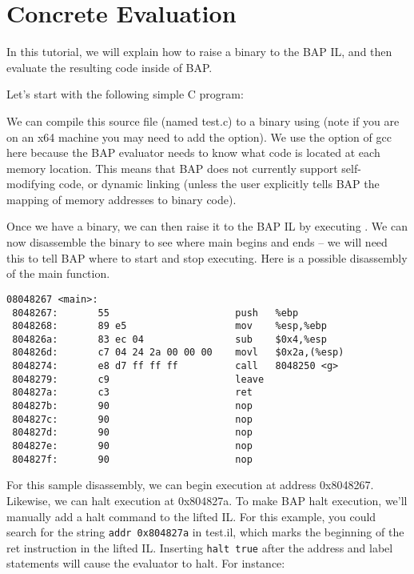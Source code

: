 \section{Concrete Evaluation}

In this tutorial, we will explain how to raise a binary to the BAP IL,
and then evaluate the resulting code inside of BAP.

Let's start with the following simple C program:


We can compile this source file (named test.c) to a binary using
 (note if you are on an x64 machine you may
need to add the  option).  We use the  option of
gcc here because the BAP evaluator needs to know what code is located
at each memory location. This means that BAP does not currently
support self-modifying code, or dynamic linking (unless the user
explicitly tells BAP the mapping of memory addresses to binary code).

Once we have a binary, we can then raise it to the BAP IL by executing
. We can now disassemble the binary
to see where main begins and ends -- we will need this to tell BAP
where to start and stop executing. Here is a possible disassembly of
the main function.

\begin{verbatim}
08048267 <main>:
 8048267:       55                      push   %ebp
 8048268:       89 e5                   mov    %esp,%ebp
 804826a:       83 ec 04                sub    $0x4,%esp
 804826d:       c7 04 24 2a 00 00 00    movl   $0x2a,(%esp)
 8048274:       e8 d7 ff ff ff          call   8048250 <g>
 8048279:       c9                      leave  
 804827a:       c3                      ret    
 804827b:       90                      nop
 804827c:       90                      nop
 804827d:       90                      nop
 804827e:       90                      nop
 804827f:       90                      nop
\end{verbatim}

For this sample disassembly, we can begin execution at address
0x8048267.  Likewise, we can halt execution at 0x804827a.  To make BAP
halt execution, we'll manually add a halt command to the lifted IL.
For this example, you could search for the string
\verb!addr 0x804827a! in test.il, which marks the beginning of the ret
instruction in the lifted IL.  Inserting \verb!halt true!  after the
address and label statements will cause the evaluator to halt.  For
instance:

